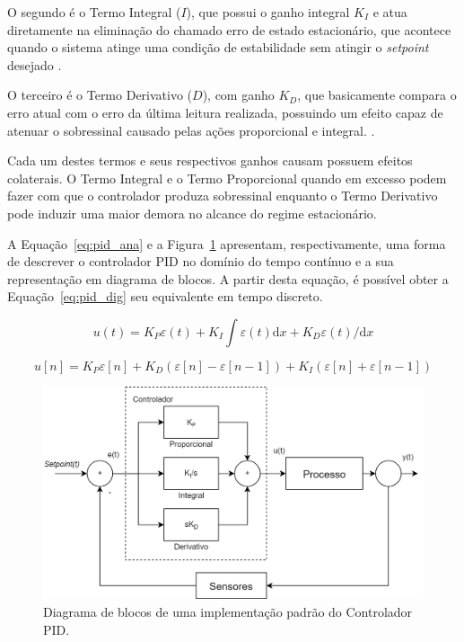 \documentclass[a4paper]{ifacconf}
\begin{document}
O segundo é o Termo Integral ($I$), que possui o ganho integral $K_{I}$ e atua diretamente na eliminação do chamado erro de estado estacionário, que acontece quando o sistema atinge uma condição de estabilidade sem atingir o \emph{setpoint} desejado \cite{pid_autotune_relay,embarcados_pid_1}.

O terceiro é o Termo Derivativo ($D$), com ganho $K_{D}$, que basicamente compara o erro atual com o erro da última leitura realizada, possuindo um efeito capaz de atenuar o sobressinal causado pelas ações proporcional e integral. \cite{pid_autotune_relay,embarcados_pid_1}.

Cada um destes termos e seus respectivos ganhos causam possuem efeitos colaterais. O Termo Integral e o Termo Proporcional quando em excesso podem fazer com que o controlador produza sobressinal enquanto o Termo Derivativo pode induzir uma maior demora no alcance do regime estacionário. 

A Equação~\eqref{eq:pid_ana} e a Figura~\ref{fig:pid_tempo} apresentam, respectivamente, uma forma de descrever o controlador PID no domínio do tempo contínuo e a sua representação em diagrama de blocos. A partir desta equação, é possível obter a Equação~\eqref{eq:pid_dig} seu equivalente em tempo discreto.

\begin{equation} \label{eq:pid_ana} 
u(t) = K_P\varepsilon(t)+K_I\int\varepsilon(t)\mathrm{d}x+K_D\varepsilon(t)/\mathrm{d}x
\end{equation}

\begin{equation} \label{eq:pid_dig} 
u[n] = K_{P}\varepsilon[n] + K_{D}(\varepsilon[n]-\varepsilon[n-1])+K_{I}(\varepsilon[n]+\varepsilon[n-1])
\end{equation}

\begin{figure}
\begin{center}
\includegraphics[scale=0.22]{Figuras/controlador_pid.png}
\caption{Diagrama de blocos de uma implementação padrão do Controlador PID.}
\label{fig:pid_tempo}
\end{center}
\end{figure}
\end{document}
